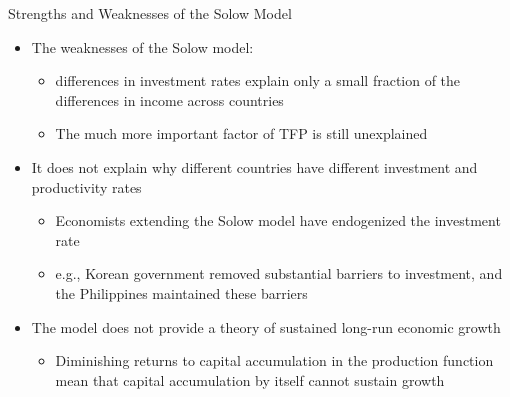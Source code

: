 \documentclass[aspectratio=1610]{beamer}
\begin{document}
\begin{frame}[wide]{Strengths and Weaknesses of the Solow Model}
	\begin{itemize}
		\item The weaknesses of the Solow model:
		\begin{itemize}
			\item differences in investment rates explain only a small fraction of the differences in income across countries
			\item The much more important factor of TFP is still unexplained
		\end{itemize}
		\item It does not explain why different countries have different investment and productivity rates
		\begin{itemize}
			\item Economists extending the Solow model have endogenized the investment rate
			\item e.g., Korean government removed substantial barriers to investment, and the Philippines maintained these barriers
		\end{itemize}
		\item The model does not provide a theory of sustained long-run economic growth
		\begin{itemize}
			\item  Diminishing returns to capital accumulation in the production function mean that capital accumulation by itself cannot sustain growth
		\end{itemize}
	\end{itemize}
\end{frame}
\end{document}
